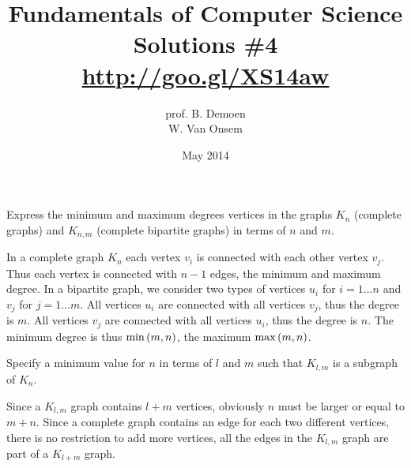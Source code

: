 \documentclass{article}
\title{Fundamentals of Computer Science\\Solutions \#4\\\url{http://goo.gl/XS14aw}}
\author{prof. B. Demoen\\W. Van Onsem}
\date{May 2014}
\begin{document}
\maketitle

\begin{exercise}
Express the minimum and maximum degrees vertices in the graphs $K_n$ (complete graphs) and $K_{n,m}$ (complete bipartite graphs) in terms of $n$ and $m$.
\begin{answer}
In a complete graph $K_n$ each vertex $v_i$ is connected with each other vertex $v_j$. Thus each vertex is connected with $n-1$ edges, the minimum and maximum degree. In a bipartite graph, we consider two types of vertices $u_i$ for $i=1\ldots n$ and $v_j$ for $j=1\ldots m$. All vertices $u_i$ are connected with all vertices $v_j$, thus the degree is $m$. All vertices $v_j$ are connected with all vertices $u_i$, thus the degree is $n$. The minimum degree is thus $\min\left( m,n \right)$, the maximum $\max\left( m,n \right)$.
\end{answer}
\end{exercise}

\begin{exercise}
Specify a minimum value for $n$ in terms of $l$ and $m$ such that $K_{l,m}$ is a subgraph of $K_n$.
\begin{answer}
Since a $K_{l,m}$ graph contains $l+m$ vertices, obviously $n$ must be larger or equal to $m+n$. Since a complete graph contains an edge for each two different vertices, there is no restriction to add more vertices, all the edges in the $K_{l,m}$ graph are part of a $K_{l+m}$ graph.
\end{answer}
\end{exercise}
\end{document}
